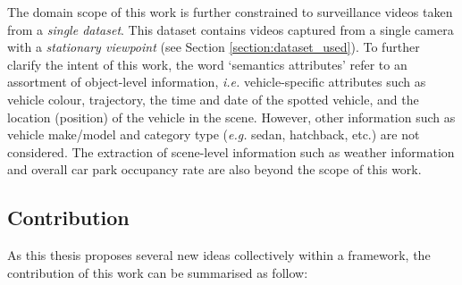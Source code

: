 The domain scope of this work is further constrained to surveillance videos taken from a \textit{single dataset}. This dataset contains videos captured from a single camera with a \textit{stationary viewpoint} (see Section \ref{section:dataset_used}). To further clarify the intent of this work, the word `semantics attributes' refer to an assortment of object-level information, \emph{i.e.} vehicle-specific attributes such as vehicle colour, trajectory, the time and date of the spotted vehicle, and the location (position) of the vehicle in the scene. However, other information
such as vehicle make/model and category type (\emph{e.g.} sedan, hatchback, etc.)
are not considered.
The extraction of scene-level information such as weather information %
and overall car park occupancy rate are also beyond the scope of this work.


\vspace{1em}
\subsection{Contribution}
As this thesis proposes several new ideas collectively within a framework,
the contribution of this work can be summarised as follow:


